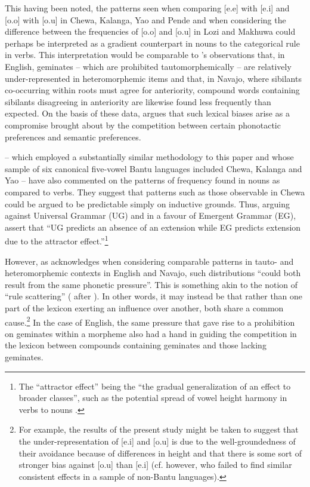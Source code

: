 \documentclass[output=paper]{langscibook}
\begin{document}
This having been noted, the patterns seen when comparing [e.e] with [e.i] and [o.o] with [o.u] in Chewa, Kalanga, Yao and Pende and when considering the difference between the frequencies of [o.o] and [o.u] in Lozi and Makhuwa could perhaps be interpreted as a gradient counterpart in nouns to the categorical rule in verbs. This interpretation would be comparable to \citeauthor{Martin11}'s \citeyearpar{Martin11} observations that, in English, geminates -- which are prohibited tautomorphemically -- are relatively under-represented in heteromorphemic items and that, in Navajo, where sibilants co-occurring within roots must agree for anteriority, compound words containing sibilants disagreeing in anteriority are likewise found less frequently than expected. On the basis of these data, \citet{Martin11} argues that such lexical biases arise as a compromise brought about by the competition between certain phonotactic preferences and semantic preferences.

\citet{Archangeli12a, Archangeli12b} -- which employed a substantially similar methodology to this paper and whose sample of six canonical five-vowel Bantu languages included Chewa, Kalanga and Yao -- have also commented on the patterns of frequency found in nouns as compared to verbs. They suggest that patterns such as those observable in Chewa could be argued to be predictable simply on inductive grounds. Thus, arguing against Universal Grammar (UG) and in a favour of Emergent Grammar (EG), \citet[214]{Archangeli12b} assert that ``UG predicts an absence of an extension while EG predicts extension due to the attractor effect.''\footnote{The ``attractor effect'' being the ``the gradual generalization of an effect to broader classes'', such as the potential spread of vowel height harmony in verbs to nouns \citep[198]{Archangeli12b}.}

However, as \citet[757]{Martin11} acknowledges when considering comparable patterns in tauto- and heteromorphemic contexts in English and Navajo, such distributions ``could both result from the same phonetic pressure''. This is something akin to the notion of ``rule scattering'' (\citealt{RBO15} after \citealt{Robinson76}). In other words, it may instead be that rather than one part of the lexicon exerting an influence over another, both share a common cause.\footnote{For example, the results of the present study might be taken to suggest that the under-representation of [e.i] and [o.u] is due to the well-groundedness of their avoidance because of differences in height and that there is some sort of stronger bias against [o.u] than [e.i] (cf. however, \citealt{Archangeli12b} who failed to find similar consistent effects in a sample of non-Bantu languages).} In the case of English, the same pressure that gave rise to a prohibition on geminates within a morpheme also had a hand in guiding the competition in the lexicon between compounds containing geminates and those lacking geminates.
\end{document}

